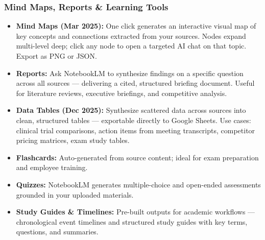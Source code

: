 \begin{frame}[fragile]\frametitle{Mind Maps, Reports \& Learning Tools}
  \begin{itemize}
    \item \textbf{Mind Maps (Mar 2025):} One click generates an interactive visual map of key concepts and connections extracted from your sources. Nodes expand multi-level deep; click any node to open a targeted AI chat on that topic. Export as PNG or JSON.
    \item \textbf{Reports:} Ask NotebookLM to synthesize findings on a specific question across all sources — delivering a cited, structured briefing document. Useful for literature reviews, executive briefings, and competitive analysis.
    \item \textbf{Data Tables (Dec 2025):} Synthesize scattered data across sources into clean, structured tables — exportable directly to Google Sheets. Use cases: clinical trial comparisons, action items from meeting transcripts, competitor pricing matrices, exam study tables.
    \item \textbf{Flashcards:} Auto-generated from source content; ideal for exam preparation and employee training.
    \item \textbf{Quizzes:} NotebookLM generates multiple-choice and open-ended assessments grounded in your uploaded materials.
    \item \textbf{Study Guides \& Timelines:} Pre-built outputs for academic workflows — chronological event timelines and structured study guides with key terms, questions, and summaries.
  \end{itemize}
\end{frame}

